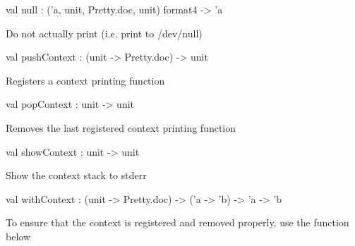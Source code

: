 \documentclass[11pt]{article}
\begin{document}
\label{val:Errormsg.null}\begin{ocamldoccode}
val null : ('a, unit, Pretty.doc, unit) format4 -> 'a
\end{ocamldoccode}
\begin{ocamldocdescription}
Do not actually print (i.e. print to /dev/null)


\end{ocamldocdescription}




\label{val:Errormsg.pushContext}\begin{ocamldoccode}
val pushContext : (unit -> Pretty.doc) -> unit
\end{ocamldoccode}
\begin{ocamldocdescription}
Registers a context printing function


\end{ocamldocdescription}




\label{val:Errormsg.popContext}\begin{ocamldoccode}
val popContext : unit -> unit
\end{ocamldoccode}
\begin{ocamldocdescription}
Removes the last registered context printing function


\end{ocamldocdescription}




\label{val:Errormsg.showContext}\begin{ocamldoccode}
val showContext : unit -> unit
\end{ocamldoccode}
\begin{ocamldocdescription}
Show the context stack to stderr


\end{ocamldocdescription}




\label{val:Errormsg.withContext}\begin{ocamldoccode}
val withContext : (unit -> Pretty.doc) -> ('a -> 'b) -> 'a -> 'b
\end{ocamldoccode}
\begin{ocamldocdescription}
To ensure that the context is registered and removed properly, use the 
    function below


\end{ocamldocdescription}
\end{document}
